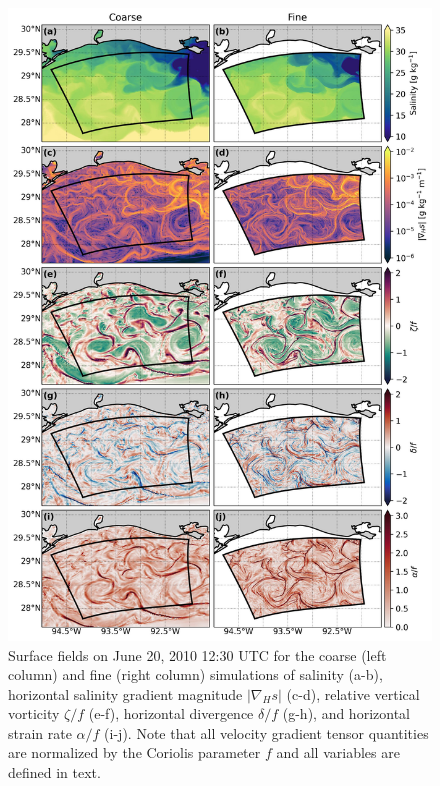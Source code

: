 \begin{figure} 
 \centerline{\includegraphics[width = 0.85\linewidth]{figures/james_2023/Figure2_snapshot.jpg}}
  \caption{Surface fields on June 20, 2010 12:30 UTC for the coarse (left column) and fine (right column) simulations of salinity (a-b), horizontal salinity gradient magnitude $|\nabla_H s|$ (c-d), relative vertical vorticity $\zeta/f$ (e-f), horizontal divergence $\delta/f$ (g-h), and horizontal strain rate $\alpha/f$ (i-j). Note that all velocity gradient tensor quantities are normalized by the Coriolis parameter $f$ and all variables are defined in text.}
  \label{fig:surface_snapshots}
\end{figure} 

